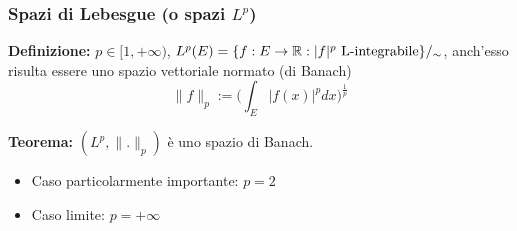 \subsubsection{Spazi di Lebesgue (o spazi $L^p$)}
\begin{tcolorbox}
	\textbf{Definizione:} $p\in[1,+\infty)$, $L^p(E)=\{f:E\to \mathbb{R}:|f|^p\text{ L-integrabile}\}/_{\sim}$, anch'esso risulta essere uno spazio vettoriale normato (di Banach)
	\[\|f\|_p:=\bigg(\int_{E}^{} |f(x)|^pdx\bigg)^{\frac{1}{p}}\] 
\end{tcolorbox}
\begin{tcolorbox}
	\textbf{Teorema:} $(L^p,\|.\|_p)$ è uno spazio di Banach.
\end{tcolorbox}
\begin{itemize}
	\item Caso particolarmente importante: $p=2$
	\item Caso limite: $p=+\infty$
\end{itemize}
